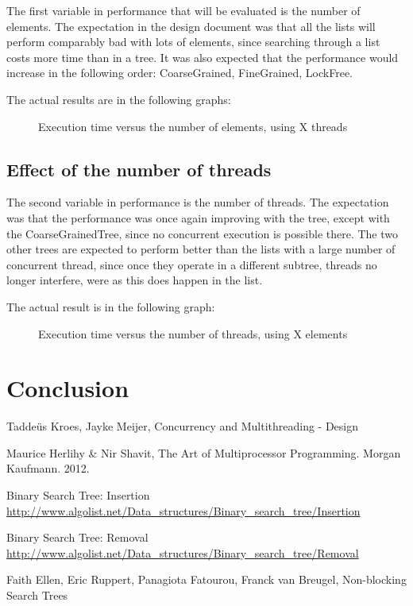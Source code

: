 \documentclass[a4paper]{article}
\begin{document}
The first variable in performance that will be evaluated is the number of elements. The
expectation in the design document was that all the lists will perform comparably bad with
lots of elements, since searching through a list costs more time than in a tree. It was 
also expected that the performance would increase in the following order: CoarseGrained,
FineGrained, LockFree.

The actual results are in the following graphs:
\begin{figure}
    \caption{Execution time versus the number of elements, using X threads}
    \label{elementsXthread}
\end{figure}

\subsection{Effect of the number of threads}

The second variable in performance is the number of threads. The expectation was that the
performance was once again improving with the tree, except with the CoarseGrainedTree, 
since no concurrent execution is possible there. The two other trees are expected to
perform better than the lists with a large number of concurrent thread, since once they
operate in a different subtree, threads no longer interfere, were as this does happen in
the list.

The actual result is in the following graph:
\begin{figure}
    \caption{Execution time versus the number of threads, using X elements}
    \label{threadsXelem}
\end{figure}

\section{Conclusion}

\begin{thebibliography}{}    
    Taddeüs Kroes, Jayke Meijer, Concurrency and Multithreading - Design

    Maurice Herlihy \& Nir Shavit, The Art of Multiprocessor Programming. Morgan Kaufmann.         
    2012.

    Binary Search Tree: Insertion
    \url{http://www.algolist.net/Data_structures/Binary_search_tree/Insertion}
    
    Binary Search Tree: Removal
    \url{http://www.algolist.net/Data_structures/Binary_search_tree/Removal}

    Faith Ellen, Eric Ruppert, Panagiota Fatourou, Franck van Breugel, Non-blocking Search 
    Trees

\end{thebibliography}
\end{document}
